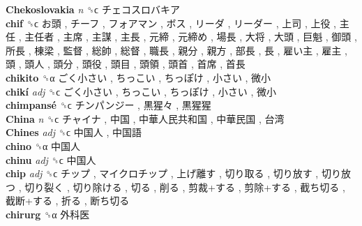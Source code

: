 \textbf{Chekoslovakia} \emph{n}  ␝ϲ   チェコスロバキア   \\
\textbf{chif} ␝ϲ   お頭 ,  チーフ ,  フォアマン ,  ボス ,  リーダ ,  リーダー ,  上司 ,  上役 ,  主任 ,  主任者 ,  主席 ,  主謀 ,  主長 ,  元締 ,  元締め ,  場長 ,  大将 ,  大頭 ,  巨魁 ,  御頭 ,  所長 ,  棟梁 ,  監督 ,  総帥 ,  総督 ,  職長 ,  親分 ,  親方 ,  部長 ,  長 ,  雇い主 ,  雇主 ,  頭 ,  頭人 ,  頭分 ,  頭役 ,  頭目 ,  頭領 ,  頭首 ,  首席 ,  首長   \\
\textbf{chikito} ␝α   ごく小さい ,  ちっこい ,  ちっぽけ ,  小さい ,  微小   \\
\textbf{chikí} \emph{adj}  ␝ϲ   ごく小さい ,  ちっこい ,  ちっぽけ ,  小さい ,  微小   \\
\textbf{chimpansé} ␝ϲ   チンパンジー ,  黒猩々 ,  黒猩猩   \\
\textbf{China} \emph{n}  ␝ϲ   チャイナ ,  中国 ,  中華人民共和国 ,  中華民国 ,  台湾   \\
\textbf{Chines} \emph{adj}  ␝ϲ   中国人 ,  中国語   \\
\textbf{chino} ␝α   中国人   \\
\textbf{chinu} \emph{adj}  ␝ϲ   中国人   \\
\textbf{chip} \emph{adj}  ␝ϲ   チップ ,  マイクロチップ ,  上げ離す ,  切り取る ,  切り放す ,  切り放つ ,  切り裂く ,  切り除ける ,  切る ,  削る ,  剪裁+する ,  剪除+する ,  截ち切る ,  截断+する ,  折る ,  断ち切る   \\
\textbf{chirurg} ␝α   外科医   \\
